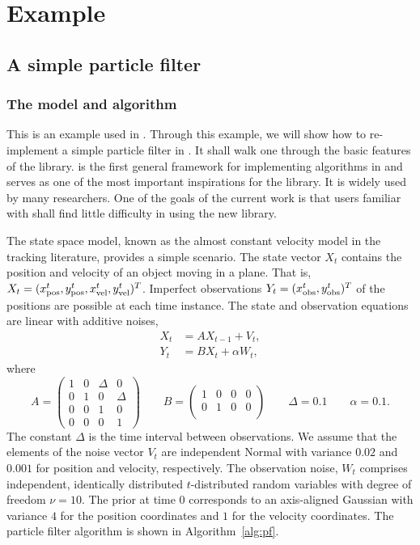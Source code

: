 \documentclass[11pt, fontset=Minion, showoverfull,
bib, mintcode, minted=cache]{marticle}
\begin{document}
\section{Example}
\label{sec:Example}

\subsection{A simple particle filter}
\label{sub:A simple particle filter}

\subsubsection{The model and algorithm}

This is an example used in \lsmctc \parencite{smctc}. Through this example, we
will show how to re-implement a simple particle filter in \vsmc. It shall walk
one through the basic features of the library. \lsmctc is the first general
framework for implementing \smc algorithms in \cpp and serves as one of the
most important inspirations for the \vsmc library. It is widely used by many
researchers. One of the goals of the current work is that users familiar with
\lsmctc shall find little difficulty in using the new library.

The state space model, known as the almost constant velocity model in the
tracking literature, provides a simple scenario. The state vector $X_t$
contains the position and velocity of an object moving in a plane. That is,
$X_t = (x_{\mathrm{pos}}^t, y_{\mathrm{pos}}^t, x_{\mathrm{vel}}^t, y_{\mathrm{vel}}^t)^T$. Imperfect observations $Y_t =
(x_{\mathrm{obs}}^t, y_{\mathrm{obs}}^t)^T$ of the positions are possible at each time instance. The
state and observation equations are linear with additive noises,
\begin{align*}
  X_t &= AX_{t-1} + V_t, \\
  Y_t &= BX_t + \alpha W_t,
\end{align*}
where
\begin{equation*}
  A = \begin{pmatrix}
    1 & 0 & \Delta & 0 \\
    0 & 1 & 0 & \Delta \\
    0 & 0 & 1 & 0 \\
    0 & 0 & 0 & 1
  \end{pmatrix} \qquad
  B = \begin{pmatrix}
    1 & 0 & 0 & 0 \\
    0 & 1 & 0 & 0 \\
  \end{pmatrix} \qquad
  \Delta = 0.1 \qquad
  \alpha = 0.1.
\end{equation*}
The constant $\Delta$ is the time interval between observations. We assume
that the elements of the noise vector $V_t$ are independent Normal with
variance $0.02$ and $0.001$ for position and velocity, respectively. The
observation noise, $W_t$ comprises independent, identically distributed
$t$-distributed random variables with degree of freedom $\nu = 10$. The prior
at time $0$ corresponds to an axis-aligned Gaussian with variance $4$ for the
position coordinates and $1$ for the velocity coordinates. The particle filter
algorithm is shown in Algorithm~\ref{alg:pf}.
\end{document}
